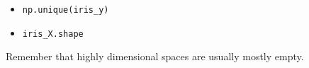 




\begin{itemize}
\item \texttt{np.unique(iris\_y)}
\item \texttt{iris\_X.shape}
\end{itemize}

Remember that highly dimensional spaces are usually mostly empty.


